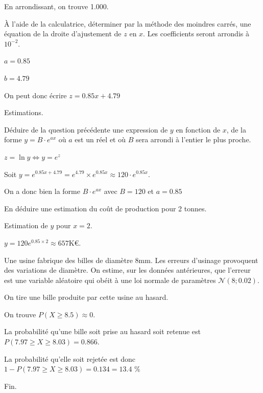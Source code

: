\documentclass[a4paper,12pt]{scrartcl}
\begin{document}
En arrondissant, on trouve 1.000.

\subquestion{}\label{question}
À l'aide de la calculatrice, déterminer par la méthode des moindres carrés, une équation de la droite d'ajustement de $z$
en $x$. Les coefficients seront arrondis à $10^{-2}$.

$a = 0.85$

$b = 4.79$

On peut donc écrire $z = 0.85x + 4.79$

\question{}
Estimations.

\subquestion{}
Déduire de la question précédente une expression de $y$ en fonction de $x$, de la forme $y = B \cdot e^{ax}$ où $a$ est un réel et où $B$ sera arrondi à l'entier le plus proche.

$z = \ln y \Leftrightarrow y = e^z$

Soit $y = e^{0.85x + 4.79} =  e^{4.79} \times e^{0.85x} \approx 120 \cdot e^{0.85x}$.

On a donc bien la forme $B \cdot e^{ax}$ avec $B = 120$ et $a = 0.85$

\subquestion{}
En déduire une estimation du coût de production pour 2 tonnes.

Estimation de $y$ pour $x = 2$. 

$y = 120 e^{0.85 \times 2} \approx 657$K€.


 Une usine fabrique des billes de diamètre 8mm. Les erreurs d'usinage provoquent des variations de diamètre. On estime, sur les données antérieures, que l'erreur est une variable aléatoire qui obéit à une loi normale de paramètres $\mathcal{N}(8;0.02)$.

On tire une bille produite par cette usine au hasard.

\question{}
On trouve $P(X \geqslant 8.5) \approx 0$.

\question{}
La probabilité qu'une bille soit prise au hasard soit retenue est $P(7.97 \geqslant X \geqslant 8.03) = 0.866$. 

La probabilité qu'elle soit rejetée est donc $1 - P(7.97 \geqslant X \geqslant 8.03) = 0.134 = 13.4$ \%

\trait

\begin{center}
Fin.
\end{center}
\end{document}
